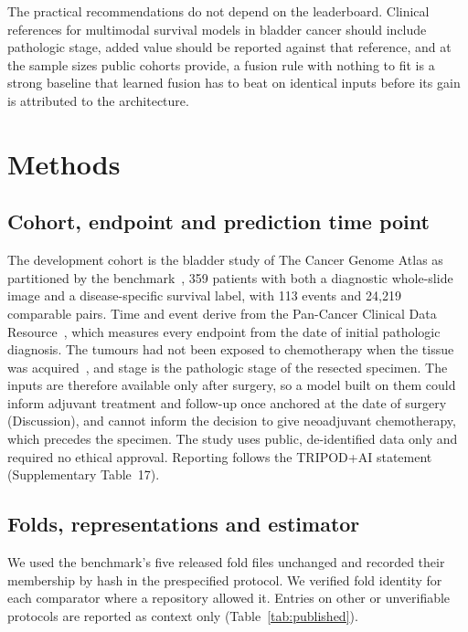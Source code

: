 \documentclass[pdflatex,sn-nature]{sn-jnl}
\begin{document}
The practical recommendations do not depend on the leaderboard. Clinical references for multimodal
survival models in bladder cancer should include pathologic stage, added value should be reported
against that reference, and at the sample sizes public cohorts provide, a fusion rule with nothing to
fit is a strong baseline that learned fusion has to beat on identical inputs before its gain is
attributed to the architecture.

\section*{Methods}

\subsection*{Cohort, endpoint and prediction time point}

The development cohort is the bladder study of The Cancer Genome Atlas as partitioned by the
benchmark~\citep{jaume2024survpath}, 359 patients with both a diagnostic whole-slide image and a
disease-specific survival label, with 113 events and 24,219 comparable pairs. Time and event derive from
the Pan-Cancer Clinical Data Resource~\citep{liu2018tcgacdr}, which measures every endpoint from the
date of initial pathologic diagnosis. The tumours had not been exposed to chemotherapy when the
tissue was acquired~\citep{robertson2017blca}, and stage is the pathologic stage of the resected
specimen. The inputs are therefore available only after surgery, so a model built on them could
inform adjuvant treatment and follow-up once anchored at the date of surgery (Discussion), and cannot
inform the decision to give neoadjuvant chemotherapy, which precedes the specimen. The study uses
public, de-identified data only and required no ethical approval. Reporting follows the TRIPOD+AI
statement~\citep{collins2024tripodai} (Supplementary Table~17).

\subsection*{Folds, representations and estimator}

We used the benchmark's five released fold files unchanged and recorded their membership by hash in
the prespecified protocol. We verified fold identity for each comparator where a repository
allowed it. Entries on other or unverifiable protocols are reported as context only
(Table~\ref{tab:published}).
\end{document}
